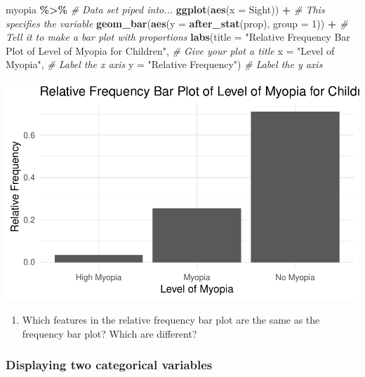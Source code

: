 \documentclass[
]{report}
\newenvironment{Shaded}{\begin{snugshade}}{\end{snugshade}}
\newcommand{\AttributeTok}[1]{\textcolor[rgb]{0.13,0.29,0.53}{#1}}
\newcommand{\CommentTok}[1]{\textcolor[rgb]{0.56,0.35,0.01}{\textit{#1}}}
\newcommand{\DecValTok}[1]{\textcolor[rgb]{0.00,0.00,0.81}{#1}}
\newcommand{\FunctionTok}[1]{\textcolor[rgb]{0.13,0.29,0.53}{\textbf{#1}}}
\newcommand{\NormalTok}[1]{#1}
\newcommand{\SpecialCharTok}[1]{\textcolor[rgb]{0.81,0.36,0.00}{\textbf{#1}}}
\newcommand{\StringTok}[1]{\textcolor[rgb]{0.31,0.60,0.02}{#1}}
\providecommand{\tightlist}{%
  \setlength{\itemsep}{0pt}\setlength{\parskip}{0pt}}
\begin{document}
\begin{Shaded}
\begin{Highlighting}[]
\NormalTok{myopia }\SpecialCharTok{\%\textgreater{}\%} \CommentTok{\# Data set piped into...}
\FunctionTok{ggplot}\NormalTok{(}\FunctionTok{aes}\NormalTok{(}\AttributeTok{x =}\NormalTok{ Sight)) }\SpecialCharTok{+}   \CommentTok{\# This specifies the variable}
  \FunctionTok{geom\_bar}\NormalTok{(}\FunctionTok{aes}\NormalTok{(}\AttributeTok{y =} \FunctionTok{after\_stat}\NormalTok{(prop), }\AttributeTok{group =} \DecValTok{1}\NormalTok{)) }\SpecialCharTok{+}  \CommentTok{\# Tell it to make a bar plot with proportions}
  \FunctionTok{labs}\NormalTok{(}\AttributeTok{title =} \StringTok{"Relative Frequency Bar Plot of Level of Myopia for Children"}\NormalTok{,  }\CommentTok{\# Give your plot a title}
       \AttributeTok{x =} \StringTok{"Level of Myopia"}\NormalTok{,   }\CommentTok{\# Label the x axis}
       \AttributeTok{y =} \StringTok{"Relative Frequency"}\NormalTok{)  }\CommentTok{\# Label the y axis}
\end{Highlighting}
\end{Shaded}

\begin{center}\includegraphics[width=0.5\linewidth]{03-OCA02-EDA_files/figure-latex/unnamed-chunk-4-1} \end{center}

\begin{enumerate}
\def\labelenumi{\arabic{enumi}.}
\setcounter{enumi}{2}
\tightlist
\item
  Which features in the relative frequency bar plot are the same as the frequency bar plot? Which are different?
\end{enumerate}

\vspace{0.3in}

\hypertarget{displaying-two-categorical-variables}{%
\subsubsection*{Displaying two categorical variables}\label{displaying-two-categorical-variables}}
\end{document}
